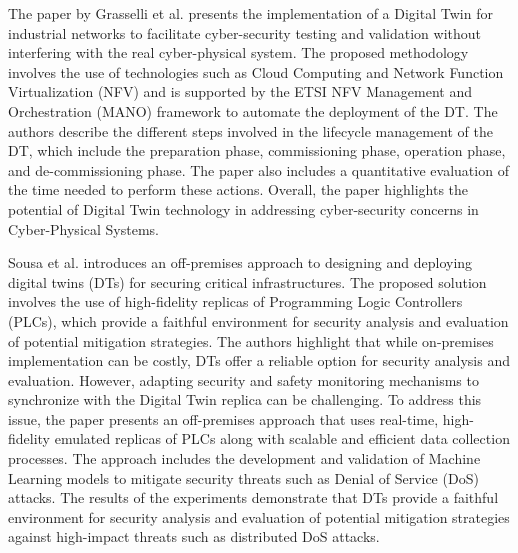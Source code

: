The paper by Grasselli et al.\cite{grasselliIndustrialNetworkDigital2022} presents the implementation of a Digital Twin for industrial networks to facilitate cyber-security testing and validation without interfering with the real cyber-physical system. The proposed methodology involves the use of technologies such as Cloud Computing and Network Function Virtualization (NFV) and is supported by the ETSI NFV Management and Orchestration (MANO) framework to automate the deployment of the DT. The authors describe the different steps involved in the lifecycle management of the DT, which include the preparation phase, commissioning phase, operation phase, and de-commissioning phase. The paper also includes a quantitative evaluation of the time needed to perform these actions. Overall, the paper highlights the potential of Digital Twin technology in addressing cyber-security concerns in Cyber-Physical Systems.




Sousa et al.\cite{sousaELEGANTSecurityCritical2021} introduces an off-premises approach to designing and deploying digital twins (DTs) for securing critical infrastructures. The proposed solution involves the use of high-fidelity replicas of Programming Logic Controllers (PLCs), which provide a faithful environment for security analysis and evaluation of potential mitigation strategies. The authors highlight that while on-premises implementation can be costly, DTs offer a reliable option for security analysis and evaluation. However, adapting security and safety monitoring mechanisms to synchronize with the Digital Twin replica can be challenging. To address this issue, the paper presents an off-premises approach that uses real-time, high-fidelity emulated replicas of PLCs along with scalable and efficient data collection processes. The approach includes the development and validation of Machine Learning models to mitigate security threats such as Denial of Service (DoS) attacks. The results of the experiments demonstrate that DTs provide a faithful environment for security analysis and evaluation of potential mitigation strategies against high-impact threats such as distributed DoS attacks.

